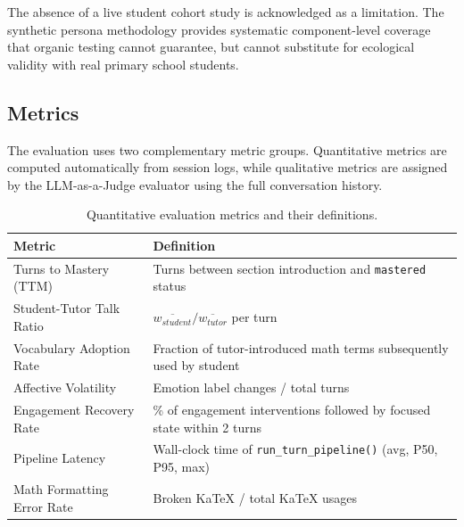 \documentclass[conference, letterpaper]{IEEEtran}
\begin{document}
The absence of a live student cohort study is acknowledged as a limitation. The synthetic persona methodology provides systematic component-level coverage that organic testing cannot guarantee, but cannot substitute for ecological validity with real primary school students.

\subsection{Metrics}

The evaluation uses two complementary metric groups. Quantitative metrics are computed automatically from session logs, while qualitative metrics are assigned by the LLM-as-a-Judge evaluator using the full conversation history.

\begin{table}[!t]
\centering
\caption{Quantitative evaluation metrics and their definitions.}
\label{tab:quant_metrics}
\small
\begin{tabularx}{\columnwidth}{@{}l>{\raggedright\arraybackslash}X@{}}
\toprule
\textbf{Metric} & \textbf{Definition} \\
\midrule
Turns to Mastery (TTM) & Turns between section introduction and \texttt{mastered} status \\
Student-Tutor Talk Ratio & $\overline{w_{student}} / \overline{w_{tutor}}$ per turn \\
Vocabulary Adoption Rate & Fraction of tutor-introduced math terms subsequently used by student \\
Affective Volatility & Emotion label changes / total turns \\
Engagement Recovery Rate & \% of engagement interventions followed by focused state within 2 turns \\
Pipeline Latency & Wall-clock time of \texttt{run\_turn\_pipeline()} (avg, P50, P95, max) \\
Math Formatting Error Rate & Broken KaTeX / total KaTeX usages \\
\bottomrule
\end{tabularx}
\end{table}
\end{document}

